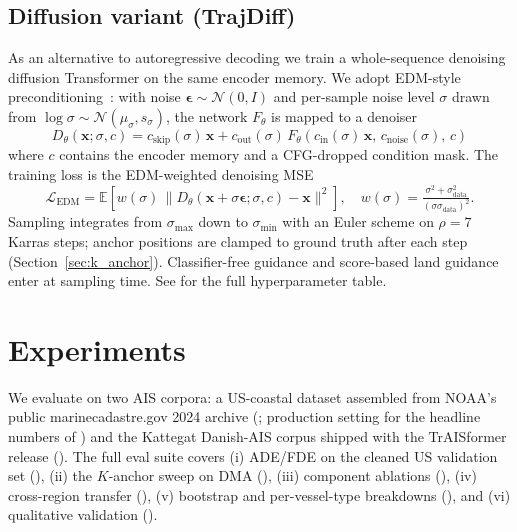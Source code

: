 \documentclass[11pt]{article}
\begin{document}
\subsection{Diffusion variant (TrajDiff)}
\label{sec:method:diffusion}

As an alternative to autoregressive decoding we train a whole-sequence
denoising diffusion Transformer on the same encoder memory. We adopt
EDM-style preconditioning~\citep{edm2022}: with noise
$\boldsymbol{\epsilon} \sim \mathcal{N}(0, I)$ and per-sample noise
level $\sigma$ drawn from $\log\sigma \sim \mathcal{N}(\mu_\sigma,
s_\sigma)$, the network $F_\theta$ is mapped to a denoiser
\begin{equation}
D_\theta(\mathbf{x}; \sigma, c) =
   c_{\text{skip}}(\sigma)\,\mathbf{x}
 + c_{\text{out}}(\sigma)\,F_\theta(c_{\text{in}}(\sigma)\,\mathbf{x},\, c_{\text{noise}}(\sigma),\, c)
\label{eq:edm_precond}
\end{equation}
where $c$ contains the encoder memory and a CFG-dropped condition mask.
The training loss is the EDM-weighted denoising MSE
\begin{equation}
\mathcal{L}_{\text{EDM}} = \mathbb{E}\!\left[
  w(\sigma) \,\|D_\theta(\mathbf{x} + \sigma\boldsymbol{\epsilon}; \sigma, c) - \mathbf{x}\|^2
\right],
\quad w(\sigma) = \tfrac{\sigma^2 + \sigma_{\text{data}}^2}{(\sigma\sigma_{\text{data}})^2}.
\end{equation}
Sampling integrates from $\sigma_{\text{max}}$ down to $\sigma_{\text{min}}$
with an Euler scheme on $\rho=7$ Karras steps; anchor positions are
clamped to ground truth after each step (Section~\ref{sec:k_anchor}).
Classifier-free guidance and score-based land guidance enter at sampling
time. See  for the full hyperparameter table.

\section{Experiments}
\label{sec:experiments}

We evaluate on two AIS corpora: a US-coastal dataset assembled from
NOAA's public marinecadastre.gov 2024 archive
(; production setting for the headline numbers
of ) and the Kattegat Danish-AIS corpus shipped
with the TrAISformer release (). The full eval
suite covers (i) ADE/FDE on the cleaned US validation set
(), (ii) the $K$-anchor sweep on DMA
(), (iii) component ablations
(), (iv) cross-region transfer
(), (v) bootstrap and per-vessel-type
breakdowns (), and (vi) qualitative validation
().
\end{document}
